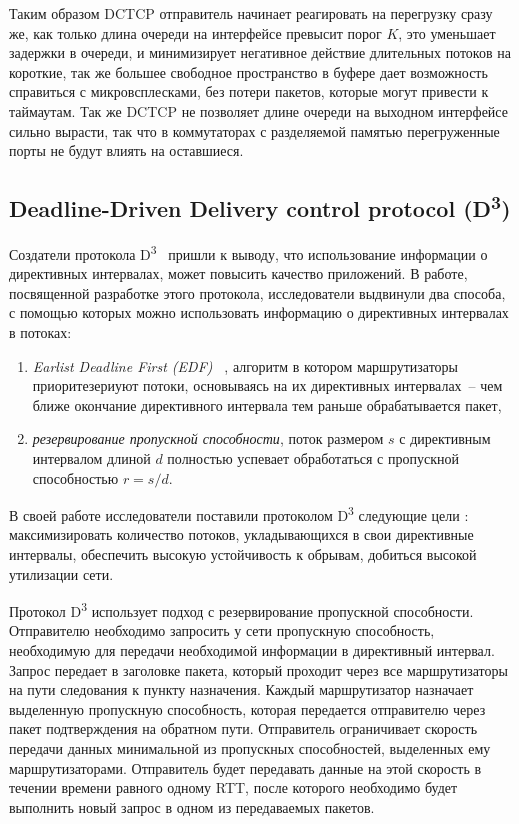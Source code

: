 \documentclass[14pt, a4paper,oneside]{extarticle}
\begin{document}
Таким  образом DCTCP отправитель начинает реагировать на перегрузку сразу же, как только длина очереди на интерфейсе превысит порог $K$, это уменьшает задержки в очереди, и минимизирует негативное действие длительных потоков на короткие, так же большее свободное пространство в буфере дает возможность справиться с микровсплесками, без потери пакетов, которые могут привести к таймаутам. Так же DCTCP не позволяет длине очереди на выходном интерфейсе сильно вырасти, так что в коммутаторах с разделяемой памятью перегруженные порты не будут влиять на оставшиеся. 

\subsection{Deadline-Driven Delivery control protocol (D\textsuperscript{3})}

Создатели протокола D\textsuperscript{3}~\cite{d3tcp} пришли к выводу, что использование информации о директивных интервалах, может повысить качество приложений. В работе, посвященной разработке этого протокола, исследователи выдвинули два способа, с помощью которых можно использовать информацию о директивных интервалах в потоках:
\begin{enumerate}
\item \emph{ Earlist Deadline First (EDF)~\cite{edf} }, алгоритм в котором маршрутизаторы приоритезериуют потоки, основываясь на их директивных интервалах~-- чем ближе окончание директивного интервала тем раньше обрабатывается пакет,
\item \emph{резервирование пропускной способности}, поток размером $s$ с директивным интервалом длиной $d$ полностью успевает обработаться с пропускной способностью $r = s/d$.
\end{enumerate} 

В своей работе исследователи поставили протоколом D\textsuperscript{3} следующие цели : максимизировать количество потоков, укладывающихся в свои директивные интервалы, обеспечить высокую устойчивость к обрывам, добиться высокой утилизации сети.

Протокол D\textsuperscript{3} использует подход с резервирование пропускной способности. Отправителю необходимо запросить у сети пропускную способность, необходимую для передачи необходимой информации в директивный интервал. Запрос передает в заголовке пакета, который проходит через все маршрутизаторы на пути следования к пункту назначения. Каждый маршрутизатор назначает выделенную пропускную способность, которая передается отправителю через пакет подтверждения на обратном пути. Отправитель ограничивает скорость передачи данных минимальной из пропускных способностей, выделенных ему маршрутизаторами. Отправитель будет передавать данные на этой скорость в течении времени равного одному RTT, после которого необходимо будет выполнить новый запрос в одном из передаваемых пакетов.
\end{document}
